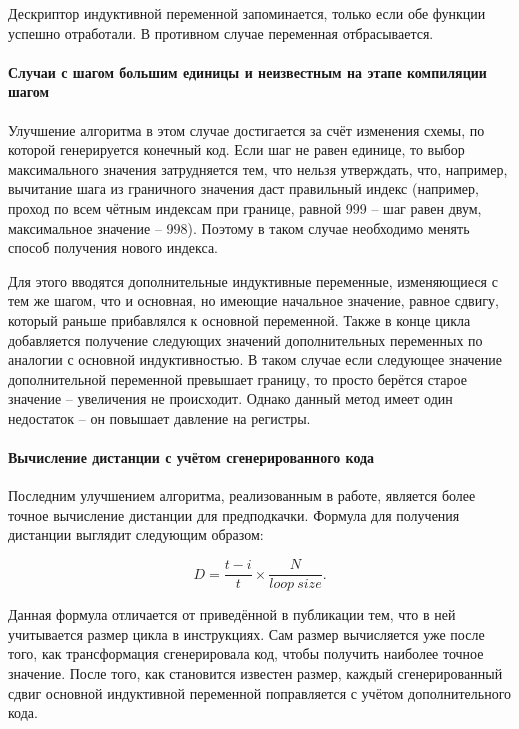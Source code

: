 \documentclass[12pt,a4paper]{article}
\begin{document}
Дескриптор индуктивной переменной запоминается, только если обе функции успешно отработали. В противном случае переменная отбрасывается.

\paragraph{Случаи с шагом большим единицы и неизвестным на этапе компиляции шагом}

Улучшение алгоритма в этом случае достигается за счёт изменения схемы, по которой генерируется конечный код. Если шаг не равен единице, то выбор максимального значения затрудняется тем, что нельзя утверждать, что, например, вычитание шага из граничного значения даст правильный индекс (например, проход по всем чётным индексам при границе, равной 999 -- шаг равен двум, максимальное значение -- 998). Поэтому в таком случае необходимо менять способ получения нового индекса.

Для этого вводятся дополнительные индуктивные переменные, изменяющиеся с тем же шагом, что и основная, но имеющие начальное значение, равное сдвигу, который раньше прибавлялся к основной переменной. Также в конце цикла добавляется получение следующих значений дополнительных переменных по аналогии с основной индуктивностью. В таком случае если следующее значение дополнительной переменной превышает границу, то просто берётся старое значение -- увеличения не происходит. Однако данный метод имеет один недостаток -- он повышает давление на регистры.

\paragraph{Вычисление дистанции с учётом сгенерированного кода}

Последним улучшением алгоритма, реализованным в работе, является более точное вычисление дистанции для предподкачки. Формула для получения дистанции выглядит следующим образом:

\begin{displaymath}
  D = \frac{t - i}{t} \times \frac{N}{loop\ size}.
\end{displaymath}

Данная формула отличается от приведённой в публикации тем, что в ней учитывается размер цикла в инструкциях. Сам размер вычисляется уже после того, как трансформация сгенерировала код, чтобы получить наиболее точное значение. После того, как становится известен размер, каждый сгенерированный сдвиг основной индуктивной переменной поправляется с учётом дополнительного кода.
\end{document}
